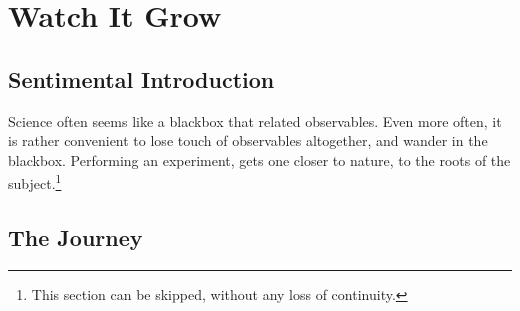 \chapter{Watch It Grow}

\section{Sentimental Introduction}
	Science often seems like a blackbox that related observables. Even more often, it is rather convenient to lose touch of observables altogether, and wander in the blackbox. Performing an experiment, gets one closer to nature, to the roots of the subject.\footnote{This section can be skipped, without any loss of continuity.}

\section{The Journey}
	